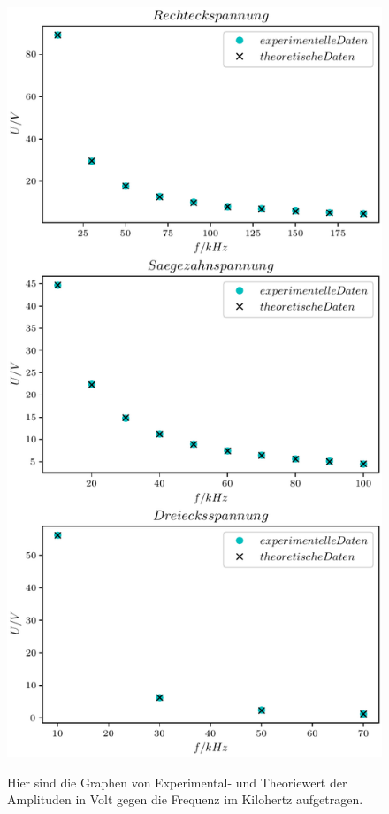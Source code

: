 \begin{figure}
  \includegraphics[width=\textwidth]{plot1.pdf}
  \label{fig:plot1}
\caption{Hier sind die Graphen von Experimental- und Theoriewert der Amplituden in Volt gegen die Frequenz im Kilohertz aufgetragen.}
\end{figure}



